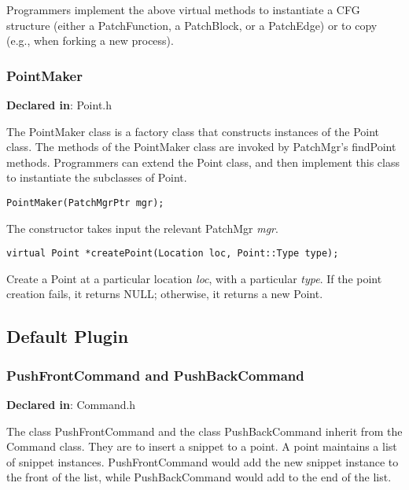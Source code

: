 Programmers implement the above virtual methods to instantiate a CFG structure
(either a PatchFunction, a PatchBlock, or a PatchEdge) or to copy (e.g., when
forking a new process).

\subsubsection{PointMaker}
\label{sec-3.2.13}

\textbf{Declared in}: Point.h

The PointMaker class is a factory class that constructs instances of the Point
class. The methods of the PointMaker class are invoked by PatchMgr's findPoint
methods. Programmers can extend the Point class, and then implement this class
to instantiate the subclasses of Point.


\begin{verbatim}
PointMaker(PatchMgrPtr mgr);

\end{verbatim}



The constructor takes input the relevant PatchMgr \emph{mgr}.


\begin{verbatim}
virtual Point *createPoint(Location loc, Point::Type type);

\end{verbatim}



Create a Point at a particular location \emph{loc}, with a particular \emph{type}. If the
point creation fails, it returns NULL; otherwise, it returns a new Point.

\subsection{Default Plugin}
\label{sec-3.3}

\subsubsection{PushFrontCommand and PushBackCommand}
\label{sec-3.3.1}

\textbf{Declared in}: Command.h

The class PushFrontCommand and the class PushBackCommand inherit from the
Command class. They are to insert a snippet to a point. A point maintains a
list of snippet instances. PushFrontCommand would add the new snippet instance
to the front of the list, while PushBackCommand would add to the end of the
list.



